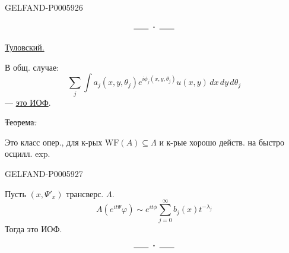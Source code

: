 \begin{GelfandAdjacentEvidence}{GELFAND-P000592}{6}

\[
\rule{1.8em}{.4pt}\;\boldsymbol{\cdot}\;\rule{1.8em}{.4pt}
\]

\underline{Туловский.}

В общ. случае:
\[
\sum_j\int a_j(x,y,\theta_j)e^{i\phi_j(x,y,\theta_j)}
 u(x,y)\,dx\,dy\,d\theta_j
\]
— \underline{это ИОФ}.

\sout{Теорема.}

Это класс опер., для к-рых \(\mathrm{WF}(A)\subseteq\Lambda\) и к-рые хорошо действ. на быстро осцилл. exp.
\end{GelfandAdjacentEvidence}
\begin{GelfandAdjacentEvidence}{GELFAND-P000592}{7}

\end{GelfandAdjacentEvidence}


Пусть \((x,\Psi'_x)\) трансверс. \(\Lambda\).
\[
A(e^{it\Psi}\varphi)\sim e^{it\phi}\sum_{j=0}^{\infty}b_j(x)t^{-\lambda_j}
\]
Тогда это ИОФ.
\[
\rule{1.8em}{.4pt}\;\boldsymbol{\cdot}\;\rule{1.8em}{.4pt}
\]


